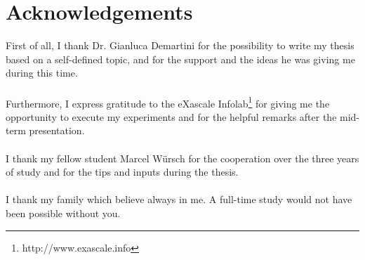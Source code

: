 \chapter*{Acknowledgements}
\thispagestyle{empty}
First of all, I thank Dr. Gianluca Demartini for the possibility to write my thesis based on a self-defined topic, and for the support and the ideas he was giving me during this time.\\\\
Furthermore, I express gratitude to the eXascale Infolab\footnote{http://www.exascale.info} for giving me the opportunity to execute my experiments and for the helpful remarks after the mid-term presentation.\\\\
I thank my fellow student Marcel W\"ursch for the cooperation over the three years of study and for the tips and inputs during the thesis.\\\\
I thank my family which believe always in me. A full-time study would not have been possible without you. 
\clearpage

